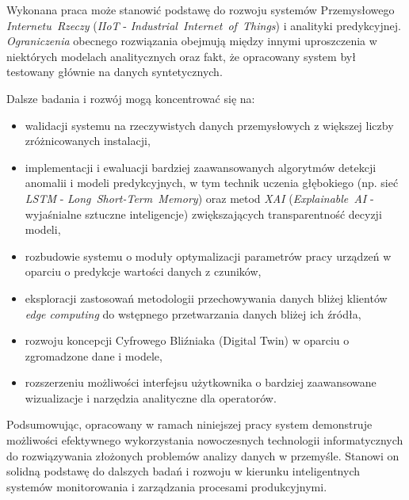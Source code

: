 \vspace{0.3em}

Wykonana praca może stanowić podstawę do rozwoju systemów Przemysłowego \mbox{\textit{Internetu Rzeczy}} (\mbox{\textit{IIoT}} - \mbox{\textit{Industrial Internet of Things}}) i analityki predykcyjnej. \textit{Ograniczenia} obecnego rozwiązania obejmują między innymi uproszczenia w niektórych modelach analitycznych oraz fakt, że opracowany system był testowany głównie na danych syntetycznych. 

\vspace{0.3em}

Dalsze badania i rozwój mogą koncentrować się na:
\begin{itemize}
    \item walidacji systemu na rzeczywistych danych przemysłowych z większej liczby zróżnicowanych instalacji,
    \item implementacji i ewaluacji bardziej zaawansowanych algorytmów detekcji anomalii i modeli predykcyjnych, w tym technik uczenia głębokiego (np. sieć \textit{LSTM} - \mbox{\textit{Long Short-Term Memory}}) oraz metod \mbox{\textit{XAI}} (\mbox{\textit{Explainable AI}} - wyjaśnialne sztuczne inteligencje) zwiększających transparentność decyzji modeli,
    \item rozbudowie systemu o moduły optymalizacji parametrów pracy urządzeń w oparciu o predykcje wartości danych z czuników,
    \item eksploracji zastosowań metodologii przechowywania danych bliżej klientów \textit{edge computing} do wstępnego przetwarzania danych bliżej ich źródła,
    \item rozwoju koncepcji Cyfrowego Bliźniaka (Digital Twin) w oparciu o zgromadzone dane i modele,
    \item rozszerzeniu możliwości interfejsu użytkownika o bardziej zaawansowane wizualizacje i narzędzia analityczne dla operatorów.
\end{itemize}

\vspace{0.3em}

Podsumowując, opracowany w ramach niniejszej pracy system demonstruje możliwości efektywnego wykorzystania nowoczesnych technologii informatycznych do rozwiązywania złożonych problemów analizy danych w przemyśle. Stanowi on solidną podstawę do dalszych badań i rozwoju w kierunku inteligentnych systemów monitorowania i zarządzania procesami produkcyjnymi. 